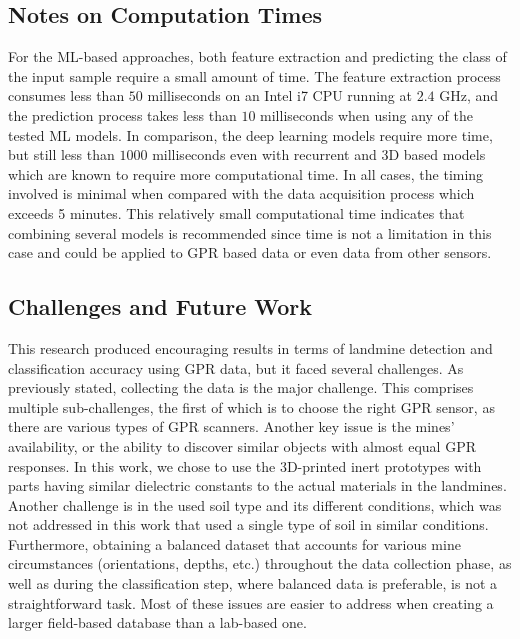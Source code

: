 \documentclass{ieeeaccess}
\begin{document}
\subsection{Notes on Computation Times}
For the ML-based approaches, both feature extraction and predicting the class of the input sample require a small amount of time. The feature extraction process consumes less than $50$ milliseconds on an Intel i7 CPU running at $2.4$ GHz, and the prediction process takes less than $10$ milliseconds when using any of the tested ML models. In comparison, the deep learning models require more time, but still less than $1000$ milliseconds even with recurrent and 3D based models which are known to require more computational time. In all cases, the timing involved is minimal when compared with the data acquisition process which exceeds 5 minutes. This relatively small computational time indicates that combining several models is recommended since time is not a limitation in this case and could be applied to GPR based data or even data from other sensors.


\subsection{Challenges and Future Work}
This research produced encouraging results in terms of landmine detection and classification accuracy using GPR data, but it faced several challenges. As previously stated, collecting the data is the major challenge. This comprises multiple sub-challenges, the first of which is to choose the right GPR sensor, as there are various types of GPR scanners. Another key issue is the mines' availability, or the ability to discover similar objects with almost equal GPR responses. In this work, we chose to use the 3D-printed inert prototypes with parts having similar dielectric constants to the actual materials in the landmines. Another challenge is in the used soil type and its different conditions, which was not addressed in this work that used a single type of soil in similar conditions. Furthermore, obtaining a balanced dataset that accounts for various mine circumstances (orientations, depths, etc.) throughout the data collection phase, as well as during the classification step, where balanced data is preferable, is not a straightforward task. Most of these issues are easier to address when creating a larger field-based database than a lab-based one.
\end{document}
